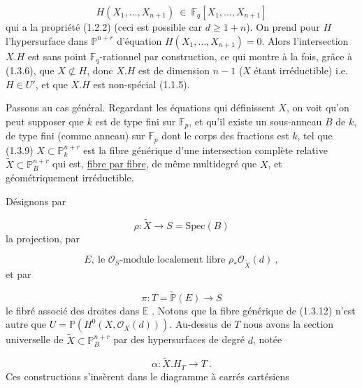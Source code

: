 \begin{equation}\tag{1.3.8}
H(X_1,\dots,X_{n+1}) \ \in \ \mathbb{F}_q[X_1,\dots, X_{n+1}]
\end{equation}
qui a la propriété (1.2.2) (ceci est possible car $d \geq 1+n$). On prend pour $H$ l'hypersurface dans $\mathbb{P}^{n+r}$ d'équation $H(X_1,\dots,X_{n+1}) = 0$. Alors
l'intersection $X.H$ est sans point $\mathbb{F}_q$-rationnel par construction, ce qui montre à la fois, grâce à (1.3.6), que $X \not\subset H$, donc $X.H$ est de dimension $n-1$ ($X$ étant irréductible) i.e. $H \in U'$, et que $X.H$ est non-spécial (1.1.5).

Passons au cas général. Regardant les équations qui définissent $X$, on voit qu'on peut supposer que $k$ est de type fini sur $\mathbb{F}_p$, et qu'il existe un sous-anneau $B$ de $k$, de type fini (comme anneau) sur $\mathbb{F}_p$ dont le corps des fractions est $k$, tel que (1.3.9) $X \subset \mathbb{P}^{n+r}_k$ est la fibre générique d'une intersection complète relative $\widetilde{X} \subset \mathbb{P}^{n+r}_B$ qui est, \underline{fibre par fibre}, de même multidegré que $X$, et géométriquement irréductible.

Désignons par

\begin{equation}\tag{1.3.10}
\rho : \widetilde{X} \longrightarrow S = \mathrm{Spec}(B)
\end{equation}
la projection, par

\begin{equation}\tag{1.3.11}
E, \ \mbox{le } \mathcal{O}_S\mbox{-module localement libre } \rho_*\mathcal{O}_{\widetilde{X}}(d) \ ,
\end{equation}
et par

\begin{equation}\tag{1.3.12}
\pi : T = \check{\mathbb{P}}(E) \longrightarrow S
\end{equation}
le fibré associé des droites dans $\mathbb{E}$ . Notons que la fibre générique de (1.3.12) n'est autre que $U = \mathbb{P}(H^0(X,\mathcal{O}_X(d)))$. Au-dessus de $T$ nous avons la section universelle de $\widetilde{X} \subset \mathbb{P}^{n+r}_B$ par des hypersurfaces de degré $d$, notée 



\begin{equation}\tag{1.3.13}
 \alpha : \widetilde{X}.H_T \longrightarrow T \ .
\end{equation}
Ces constructions s'insèrent dans le diagramme à carrés cartésiens

